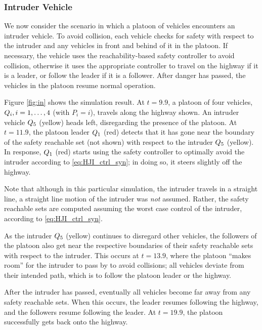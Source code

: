\subsubsection{Intruder Vehicle}
We now consider the scenario in which a platoon of vehicles encounters an intruder vehicle. To avoid collision, each vehicle checks for safety with respect to the intruder and any vehicles in front and behind of it in the platoon. If necessary, the vehicle uses the reachability-based safety controller to avoid collision, otherwise it uses the appropriate controller to travel on the highway if it is a leader, or follow the leader if it is a follower. After danger has passed, the vehicles in the platoon resume normal operation.

Figure \ref{fig:in} shows the simulation result. At $t=9.9$, a platoon of four vehicles, $Q_{i},i=1,\ldots,4$ (with $P_i = i$), travels along the highway shown. An intruder vehicle $Q_{5}$ (yellow) heads left, disregarding the presence of the platoon. At $t=11.9$, the platoon leader $Q_{1}$ (red) detects that it has gone near the boundary of the safety reachable set (not shown) with respect to the intruder $Q_{5}$ (yellow). In response, $Q_{1}$ (red) starts using the safety controller to optimally avoid the intruder according to \eqref{eq:HJI_ctrl_syn}; in doing so, it steers slightly off the highway. 

Note that although in this particular simulation, the intruder travels in a straight line, a straight line motion of the intruder was \textit{not} assumed. Rather, the safety reachable sets are computed assuming the worst case control of the intruder, according to \eqref{eq:HJI_ctrl_syn}.

As the intruder $Q_{5}$ (yellow) continues to disregard other vehicles, the followers of the platoon also get near the respective boundaries of their safety reachable sets with respect to the intruder. This occurs at $t=13.9$, where the platoon ``makes room'' for the intruder to pass by to avoid collisions; all vehicles deviate from their intended path, which is to follow the platoon leader or the highway.

After the intruder has passed, eventually all vehicles become far away from any safety reachable sets. When this occurs, the leader resumes following the highway, and the followers resume following the leader. At $t=19.9$, the platoon successfully gets back onto the highway.

